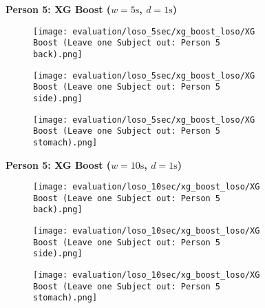 \begin{figure}
    \textbf{Person 5: XG Boost ($w=5\si{\s}$, $d=1\si{\s}$)}
      \centering
      \begin{subfigure}{1\textwidth}
          \texttt{[image: evaluation/loso\_5sec/xg\_boost\_loso/XG Boost (Leave one Subject out: Person 5 back).png]}
        \end{subfigure}
        \begin{subfigure}{1\textwidth}
          \texttt{[image: evaluation/loso\_5sec/xg\_boost\_loso/XG Boost (Leave one Subject out: Person 5 side).png]}
        \end{subfigure}
        \begin{subfigure}{1\textwidth}
          \texttt{[image: evaluation/loso\_5sec/xg\_boost\_loso/XG Boost (Leave one Subject out: Person 5 stomach).png]}
      \end{subfigure}
        \textbf{Person 5: XG Boost ($w=10\si{\s}$, $d=1\si{\s}$)}
      \centering
      \begin{subfigure}{1\textwidth}
          \texttt{[image: evaluation/loso\_10sec/xg\_boost\_loso/XG Boost (Leave one Subject out: Person 5 back).png]}
        \end{subfigure}
        \begin{subfigure}{1\textwidth}
          \texttt{[image: evaluation/loso\_10sec/xg\_boost\_loso/XG Boost (Leave one Subject out: Person 5 side).png]}
        \end{subfigure}
        \begin{subfigure}{1\textwidth}
          \texttt{[image: evaluation/loso\_10sec/xg\_boost\_loso/XG Boost (Leave one Subject out: Person 5 stomach).png]}
      \end{subfigure}
  
      \label{evaluation:xgboost_loso:person5}
\end{figure}

